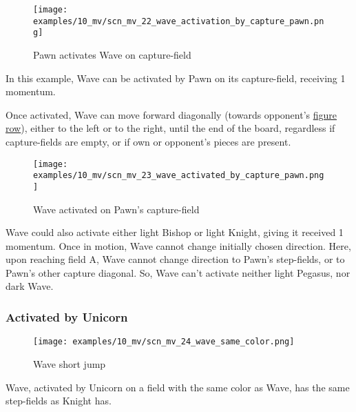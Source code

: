 \clearpage %

\vspace*{-2.1\baselineskip}
\noindent
\begin{figure}[!h]
\texttt{[image: examples/10\_mv/scn\_mv\_22\_wave\_activation\_by\_capture\_pawn.png]}
\caption{Pawn activates Wave on capture-field}
\label{fig:scn_mv_22_wave_activation_by_capture_pawn}
\end{figure}

In this example, Wave can be activated by Pawn on its capture-field, receiving 1 momentum.

Once activated, Wave can move forward diagonally (towards opponent's
\hyperref[sec:Terms/Figure row]{figure row}), either to the left or to the right, until the
end of the board, regardless if capture-fields are empty, or if own or opponent's pieces are
present.

\clearpage %

\vspace*{-2.1\baselineskip}
\noindent
\begin{figure}[!h]
\texttt{[image: examples/10\_mv/scn\_mv\_23\_wave\_activated\_by\_capture\_pawn.png]}
\caption{Wave activated on Pawn's capture-field}
\label{fig:scn_mv_23_wave_activated_by_capture_pawn}
\end{figure}

Wave could also activate either light Bishop or light Knight, giving it received 1 momentum.
Once in motion, Wave cannot change initially chosen direction. Here, upon reaching field A,
Wave cannot change direction to Pawn's step-fields, or to Pawn's other capture diagonal. So,
Wave can't activate neither light Pegasus, nor dark Wave.

\clearpage %

\subsubsection*{Activated by Unicorn}

\vspace*{-0.7\baselineskip}
\noindent
\begin{wrapfigure}[10]{l}{0.45\textwidth}
\centering
\texttt{[image: examples/10\_mv/scn\_mv\_24\_wave\_same\_color.png]}
\vspace*{-0.3\baselineskip}
\caption{Wave short jump}
\label{fig:scn_mv_24_wave_same_color}
\end{wrapfigure}
Wave, activated by Unicorn on a field with the same color as Wave, has the same step-fields
as Knight has.

